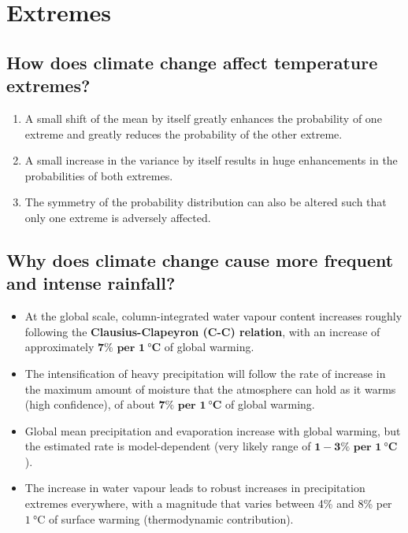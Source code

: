 \documentclass[11pt]{article}
\begin{document}
\newpage

\section{Extremes}
\label{sec:org753ea0a}

\subsection{How does climate change affect temperature extremes?}
\label{sec:orge10e0fb}
\begin{enumerate}
\item A small shift of the mean by itself greatly enhances the probability of one extreme and greatly reduces the probability of the other extreme.
\item A small increase in the variance by itself results in huge enhancements in the probabilities of both extremes.
\item The symmetry of the probability distribution can also be altered such that only one extreme is adversely affected.
\end{enumerate}

\subsection{Why does climate change cause more frequent and intense rainfall?}
\label{sec:org637c664}
\begin{itemize}
\item At the global scale, column-integrated water vapour content increases roughly following the \textbf{Clausius-Clapeyron (C-C) relation}, with an increase of approximately \(\boldsymbol{7\%} \textbf{ per } \boldsymbol{\qty{1}{\degreeCelsius}}\) of global warming.
\item The intensification of heavy precipitation will follow the rate of increase in the maximum amount of moisture that the atmosphere can hold as it warms (high confidence), of about \(\boldsymbol{7\%} \textbf{ per } \boldsymbol{\qty{1}{\degreeCelsius}}\) of global warming.
\item Global mean precipitation and evaporation increase with global warming, but the estimated rate is model-dependent (very likely range of \(\boldsymbol{1 - 3\%} \textbf{ per } \boldsymbol{\qty{1}{\degreeCelsius}}\)).
\item The increase in water vapour leads to robust increases in precipitation extremes everywhere, with a magnitude that varies between 4\% and 8\% per \(\qty{1}{\degreeCelsius}\) of surface warming (thermodynamic contribution).
\end{itemize}
\end{document}

